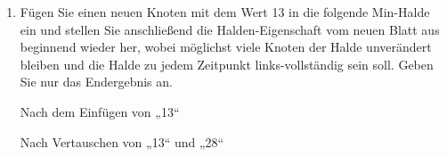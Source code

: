 \documentclass{bschlangaul-aufgabe}
\begin{document}
\begin{enumerate}
\begin{liAntwort}
\begin{minipage}{0.5\linewidth}
\end{minipage}
\begin{minipage}{0.5\linewidth}
\end{minipage}
\end{liAntwort}


\item Fügen Sie einen neuen Knoten mit dem Wert 13 in die folgende
Min-Halde ein und stellen Sie anschließend die Halden-Eigenschaft vom
neuen Blatt aus beginnend wieder her, wobei möglichst viele Knoten der
Halde unverändert bleiben und die Halde zu jedem Zeitpunkt
links-vollständig sein soll. Geben Sie nur das Endergebnis an.

\begin{center}
\end{center}

\begin{liDiagramm}{Nach dem Einfügen von „13“}

\end{liDiagramm}

\begin{liDiagramm}{Nach Vertauschen von „13“ und „28“}


\end{liDiagramm}
\end{enumerate}
\end{document}
